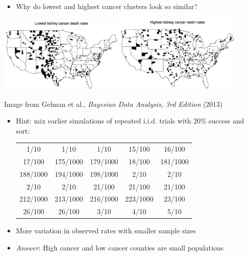 \documentclass[10pt]{report}
\begin{document}
%
\begin{itemize}
\item Why do lowest and highest cancer clusters look so similar?
\end{itemize}
\vspace*{1pt}
\begin{center}
\hfill
\includegraphics[width=0.45\textwidth]{img/low-cancer.jpg}
\hfill
\includegraphics[width=0.45\textwidth]{img/high-cancer.jpg}
\hfill
\end{center}
\vfill
\hfill {\tiny Image from Gelman et al., {\slshape Bayesian Data Analysis, 3rd Edition} (2013)}

%
\begin{itemize}
\item Hint: mix earlier simulations of repeated i.i.d. trials with 20\% success and sort:
{\footnotesize
\begin{center}
\begin{tabular}{ccccc}
1/10 &  1/10 &  1/10 &  15/100 &  16/100
\\
17/100 &  175/1000 &  179/1000 &  18/100 &  181/1000
\\
188/1000 &  194/1000 &  198/1000 & 2/10 &  2/10 
\\
2/10 &  2/10 & 21/100 &  21/100 &  21/100 
\\
212/1000 &  213/1000 &   216/1000 &   223/1000 &  23/100
\\
26/100 &  26/100 &  3/10 &  4/10 &  5/10 
\end{tabular}
\end{center}
}
\item More variation in observed rates with smaller sample sizes
\vfill
\item \emph{Answer}: High cancer and low cancer counties are small populations
\end{itemize}
\end{document}
